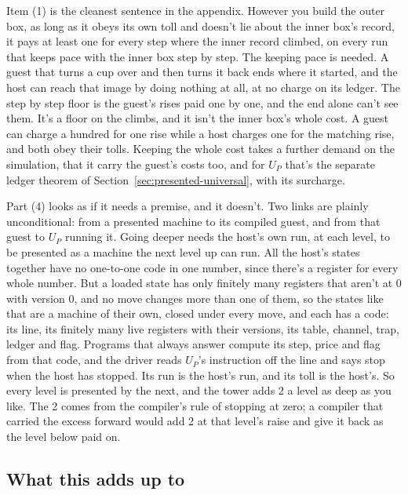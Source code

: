 \documentclass[11pt,twoside]{article}
\theoremstyle{thielethm}
\theoremstyle{thieledef}
\theoremstyle{thieledef}
\theoremstyle{thieledef}
\theoremstyle{thielethm}
\theoremstyle{thieleobs}
\theoremstyle{thielethm}
\begin{document}
Item (1) is the cleanest sentence in the appendix. However you build the outer box, as long as it obeys
its own toll and doesn't lie about the inner box's record, it pays at least one for every step
where the inner record climbed, on every run that keeps pace with the inner box step by step.
The keeping pace is needed. A guest that turns a cup over and then turns it back ends where it
started, and the host can reach that image by doing nothing at all, at no charge on its ledger. The step by step
floor is the guest's rises paid one by one, and the end alone can't see them. It's a floor on the climbs, and it isn't the inner box's whole
cost. A guest can charge a hundred for one rise while a host charges one for the matching rise,
and both obey their tolls. Keeping the whole cost takes a further demand on the simulation, that
it carry the guest's costs too, and for $U_P$ that's the separate ledger theorem of
Section~\ref{sec:presented-universal}, with its surcharge.

Part (4) looks as if it needs a premise, and it doesn't. Two links are plainly unconditional: from a presented machine to its compiled guest, and from that guest to $U_P$ running it. Going deeper needs the host's own run, at each level, to be presented as a machine the next level up can run. All the host's states together have no one-to-one code in one number, since there's a register for every whole number. But a loaded state has only finitely many registers that aren't at 0 with version 0, and no move changes more than one of them, so the states like that are a machine of their own, closed under every move, and each has a code: its line, its finitely many live registers with their versions, its table, channel, trap, ledger and flag. Programs that always answer compute its step, price and flag from that code, and the driver reads $U_P$'s instruction off the line and says stop when the host has stopped. Its run is the host's run, and its toll is the host's. So every level is presented by the next, and the tower adds 2 a level as deep as you like. The 2 comes from the compiler's rule of stopping at zero; a compiler that carried the excess forward would add 2 at that level's raise and give it back as the level below paid on.

\subsection{What this adds up to}
\end{document}
